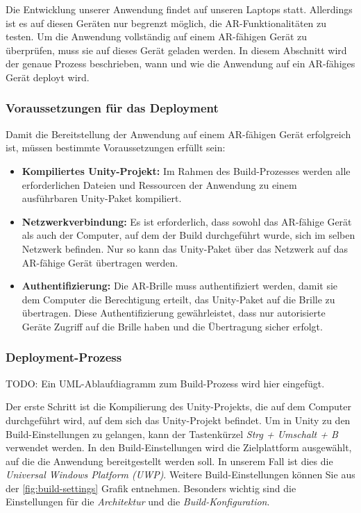 Die Entwicklung unserer Anwendung findet auf unseren Laptops statt. Allerdings ist es auf diesen Geräten nur begrenzt
möglich, die AR-Funktionalitäten zu testen. Um die Anwendung vollständig auf einem AR-fähigen Gerät zu überprüfen, muss
sie auf dieses Gerät geladen werden. In diesem Abschnitt wird der genaue Prozess beschrieben, wann und wie die Anwendung
auf ein AR-fähiges Gerät deployt wird.

\subsubsection{Voraussetzungen für das Deployment}

Damit die Bereitstellung der Anwendung auf einem AR-fähigen Gerät erfolgreich ist, müssen bestimmte Voraussetzungen erfüllt sein:

\begin{itemize}
    \item \textbf{Kompiliertes Unity-Projekt:} Im Rahmen des Build-Prozesses werden alle erforderlichen Dateien und
    Ressourcen der Anwendung zu einem ausführbaren Unity-Paket kompiliert.

    \item \textbf{Netzwerkverbindung:} Es ist erforderlich, dass sowohl das AR-fähige Gerät als auch der Computer, auf
    dem der Build durchgeführt wurde, sich im selben Netzwerk befinden. Nur so kann das Unity-Paket über das Netzwerk
    auf das AR-fähige Gerät übertragen werden.

    \item \textbf{Authentifizierung:} Die AR-Brille muss authentifiziert werden, damit sie dem Computer die Berechtigung
    erteilt, das Unity-Paket auf die Brille zu übertragen. Diese Authentifizierung gewährleistet, dass nur autorisierte
    Geräte Zugriff auf die Brille haben und die Übertragung sicher erfolgt.

\end{itemize}

\subsubsection{Deployment-Prozess}

TODO: Ein UML-Ablaufdiagramm zum Build-Prozess wird hier eingefügt.

Der erste Schritt ist die Kompilierung des Unity-Projekts, die auf dem Computer durchgeführt wird, auf dem sich das
Unity-Projekt befindet. Um in Unity zu den Build-Einstellungen zu gelangen, kann der Tastenkürzel \textit{Strg + Umschalt + B}
verwendet werden. In den Build-Einstellungen wird die Zielplattform ausgewählt, auf die die Anwendung bereitgestellt
werden soll. In unserem Fall ist dies die \textit{Universal Windows Platform (UWP)}. Weitere Build-Einstellungen können
Sie aus der \ref{fig:build-settings} Grafik entnehmen. Besonders wichtig sind die Einstellungen für die \textit{Architektur} und
die \textit{Build-Konfiguration}.

